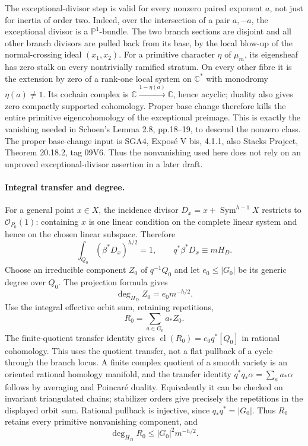 The exceptional-divisor step is valid for every nonzero paired
exponent \(a\), not just for inertia of order two. Indeed, over the
intersection of a pair \(a,-a\), the exceptional divisor is a
\(\mathbb P^1\)-bundle. The two branch sections are disjoint and
all other branch divisors are pulled back from its base, by the local
blow-up of the normal-crossing ideal \((x_1,x_2)\). For a primitive
character \(\eta\) of \(\mu_m\), its eigensheaf has zero stalk on
every nontrivially ramified stratum. On every other fibre it is the
extension by zero of a rank-one local system on \(\mathbb C^*\)
with monodromy \(\eta(a)\ne1\). Its cochain complex is
\(\mathbb C\xrightarrow{1-\eta(a)}\mathbb C\), hence acyclic;
duality also gives zero compactly supported cohomology. Proper base
change therefore kills the entire primitive eigencohomology of the
exceptional preimage. This is exactly the vanishing needed in
Schoen's Lemma 2.8, pp.18--19, to descend the nonzero class. The
proper base-change input is SGA4, Expos\'e V bis, 4.1.1, also Stacks
Project, Theorem 20.18.2, tag 09V6. Thus the nonvanishing used here
does not rely on an unproved exceptional-divisor assertion in a
later draft.

\paragraph{Integral transfer and degree.}
For a general point \(x\in X\), the incidence divisor
\(D_x=x+\operatorname{Sym}^{h-1}X\) restricts to
\(\mathcal O_{P_0}(1)\): containing \(x\) is one linear condition
on the complete linear system and hence on the chosen linear subspace.
Therefore
\[
 \int_{Q_0}(\beta^*D_x)^{h/2}=1,
 \qquad q^*\beta^*D_x\equiv mH_D.
\]
Choose an irreducible component \(Z_0\) of \(q^{-1}Q_0\) and
let \(e_0\le|G_0|\) be its generic degree over \(Q_0\). The
projection formula gives
\[
 \deg_{H_D}Z_0=e_0m^{-h/2}.
\]
Use the integral effective orbit sum, retaining repetitions,
\[
 R_0=\sum_{a\in G_0}a_*Z_0.
\]
The finite-quotient transfer identity gives
\(\operatorname{cl}(R_0)=e_0q^*[Q_0]\) in rational cohomology.
This uses the quotient transfer, not a flat pullback of a cycle through
the branch locus. A finite complex quotient of a smooth variety is an
oriented rational homology manifold, and the transfer identity
\(q^*q_*\alpha=\sum_a a_*\alpha\) follows by averaging and
Poincar\'e duality. Equivalently it can be checked on invariant
triangulated chains; stabilizer orders give precisely the repetitions
in the displayed orbit sum. Rational pullback is injective, since
\(q_*q^*=|G_0|\). Thus \(R_0\) retains every primitive
nonvanishing component, and
\[
 \deg_{H_D}R_0
 \le |G_0|^2m^{-h/2}.
\]

